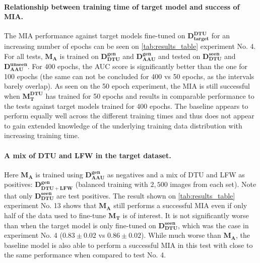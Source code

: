 \paragraph{Relationship between training time of target model and success of MIA.}
The MIA performance against target models fine-tuned on $\mathbf{D_{target}^{DTU}}$ for an increasing number of epochs can be seen on \cref{tab:results_table} experiment No. 4. For all tests, $\mathbf{M_A}$ is trained on $\mathbf{D_{DTU}^{gen}}$ and $\mathbf{D_{AAU}^{gen}}$ and tested on $\mathbf{D_{DTU}^{seen}}$ and $\mathbf{D_{AAU}^{unseen}}$. For 400 epochs, the AUC score is significantly better than the one for 100 epochs (the same can not be concluded for 400 vs 50 epochs, as the intervals barely overlap). As seen on the 50 epoch experiment, the MIA is still successful when $\mathbf{M_T^{DTU}}$ has trained for 50 epochs and results in comparable performance to the tests against target models trained for 400 epochs. The baseline appears to perform equally well across the different training times and thus does not appear to gain extended knowledge of the underlying training data distribution with increasing training time.

\paragraph{A mix of DTU and LFW in the target dataset.}
Here $\mathbf{M_A}$ is trained using $\mathbf{D_{AAU}^{gen}}$ as negatives and a mix of DTU and LFW as positives: $\mathbf{D_{DTU+LFW}^{gen}}$ (balanced training with $2,500$ images from each set). Note that only $\mathbf{D_{DTU}^{seen}}$ are test positives. The result shown on \cref{tab:results_table} experiment No. 13 shows that $\mathbf{M_A}$ still performs a successful MIA even if only half of the data used to fine-tune $\mathbf{M_T}$ is of interest. It is not significantly worse than when the target model is only fine-tuned on $\mathbf{D_{DTU}^{seen}}$, which was the case in experiment No. 4 ($0.83\pm0.02$ vs $0.86\pm0.02$). While much worse than $\mathbf{M_A}$, the baseline model is also able to perform a successful MIA in this test with close to the same performance when compared to test No. 4.

